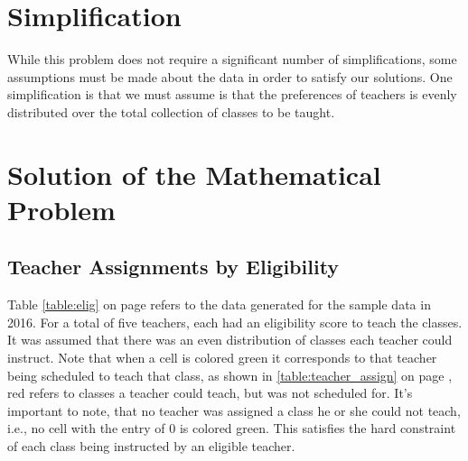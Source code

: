 \documentclass[11pt]{article}
\begin{document}
\section{Simplification}
While this problem does not require a significant number of simplifications, some assumptions must be made about the data in order to satisfy our solutions. One simplification is that we must assume is that the preferences of teachers is evenly distributed over the total collection of classes to be taught.

\section{Solution of the Mathematical Problem}
\subsection{Teacher Assignments by Eligibility}
Table \ref{table:elig} on page \pageref{table:elig} refers to the data generated for the sample data in 2016. For a total of five teachers, each had an eligibility score to teach the classes. It was assumed that there was an even distribution of classes each teacher could instruct. Note that when a cell is colored green it corresponds to that teacher being scheduled to teach that class, as shown in \ref{table:teacher_assign} on page \pageref{table:teacher_assign}, red refers to classes a teacher could teach, but was not scheduled for. It's important to note, that no teacher was assigned a class he or she could not teach, i.e., no cell with the entry of 0 is colored green. This satisfies the hard constraint of each class being instructed by an eligible teacher. 
\end{document}
